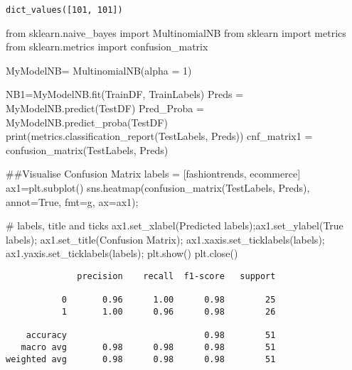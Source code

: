 \documentclass[
  letterpaper,
  DIV=11,
  numbers=noendperiod]{scrartcl}
\newenvironment{Shaded}{\begin{snugshade}}{\end{snugshade}}
\newcommand{\BuiltInTok}[1]{\textcolor[rgb]{0.00,0.23,0.31}{#1}}
\newcommand{\CommentTok}[1]{\textcolor[rgb]{0.37,0.37,0.37}{#1}}
\newcommand{\DecValTok}[1]{\textcolor[rgb]{0.68,0.00,0.00}{#1}}
\newcommand{\ImportTok}[1]{\textcolor[rgb]{0.00,0.46,0.62}{#1}}
\newcommand{\NormalTok}[1]{\textcolor[rgb]{0.00,0.23,0.31}{#1}}
\newcommand{\OperatorTok}[1]{\textcolor[rgb]{0.37,0.37,0.37}{#1}}
\newcommand{\StringTok}[1]{\textcolor[rgb]{0.13,0.47,0.30}{#1}}
\newcommand{\VariableTok}[1]{\textcolor[rgb]{0.07,0.07,0.07}{#1}}
\begin{document}
\begin{verbatim}
dict_values([101, 101])
\end{verbatim}

\begin{Shaded}
\begin{Highlighting}[]
\ImportTok{from}\NormalTok{ sklearn.naive\_bayes }\ImportTok{import}\NormalTok{ MultinomialNB}
\ImportTok{from}\NormalTok{ sklearn }\ImportTok{import}\NormalTok{ metrics}
\ImportTok{from}\NormalTok{ sklearn.metrics }\ImportTok{import}\NormalTok{ confusion\_matrix}

\NormalTok{MyModelNB}\OperatorTok{=}\NormalTok{ MultinomialNB(alpha }\OperatorTok{=} \DecValTok{1}\NormalTok{)}

\NormalTok{NB1}\OperatorTok{=}\NormalTok{MyModelNB.fit(TrainDF, TrainLabels)}
\NormalTok{Preds }\OperatorTok{=}\NormalTok{ MyModelNB.predict(TestDF)}
\NormalTok{Pred\_Proba }\OperatorTok{=}\NormalTok{ MyModelNB.predict\_proba(TestDF)}
\BuiltInTok{print}\NormalTok{(metrics.classification\_report(TestLabels, Preds))}
\NormalTok{cnf\_matrix1 }\OperatorTok{=}\NormalTok{ confusion\_matrix(TestLabels, Preds)}

\CommentTok{\#\#Visualise Confusion Matrix}
\NormalTok{labels }\OperatorTok{=}\NormalTok{ [}\StringTok{\textquotesingle{}fashiontrends\textquotesingle{}}\NormalTok{, }\StringTok{\textquotesingle{}ecommerce\textquotesingle{}}\NormalTok{]}
\NormalTok{ax1}\OperatorTok{=}\NormalTok{plt.subplot()}
\NormalTok{sns.heatmap(confusion\_matrix(TestLabels, Preds), annot}\OperatorTok{=}\VariableTok{True}\NormalTok{, fmt}\OperatorTok{=}\StringTok{\textquotesingle{}g\textquotesingle{}}\NormalTok{, ax}\OperatorTok{=}\NormalTok{ax1)}\OperatorTok{;}

\CommentTok{\# labels, title and ticks}
\NormalTok{ax1.set\_xlabel(}\StringTok{\textquotesingle{}Predicted labels\textquotesingle{}}\NormalTok{)}\OperatorTok{;}\NormalTok{ax1.set\_ylabel(}\StringTok{\textquotesingle{}True labels\textquotesingle{}}\NormalTok{)}\OperatorTok{;} 
\NormalTok{ax1.set\_title(}\StringTok{\textquotesingle{}Confusion Matrix\textquotesingle{}}\NormalTok{)}\OperatorTok{;} 
\NormalTok{ax1.xaxis.set\_ticklabels(labels)}\OperatorTok{;}\NormalTok{ ax1.yaxis.set\_ticklabels(labels)}\OperatorTok{;}
\NormalTok{plt.show()}
\NormalTok{plt.close()}
\end{Highlighting}
\end{Shaded}

\begin{verbatim}
              precision    recall  f1-score   support

           0       0.96      1.00      0.98        25
           1       1.00      0.96      0.98        26

    accuracy                           0.98        51
   macro avg       0.98      0.98      0.98        51
weighted avg       0.98      0.98      0.98        51
\end{verbatim}
\end{document}
